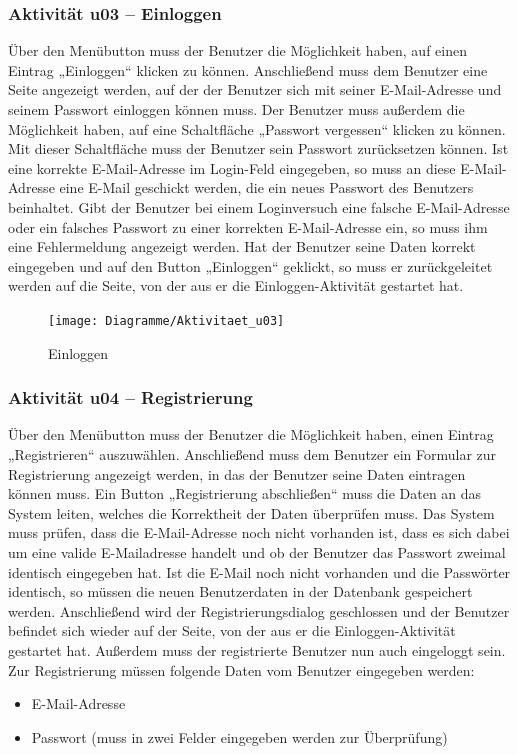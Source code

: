 \documentclass[a4paper,12pt,oneside]{scrartcl}
\begin{document}
\subsubsection{Aktivität u03 – Einloggen}
Über den Menübutton muss der Benutzer die Möglichkeit haben, auf einen Eintrag „Einloggen“ klicken zu können.
Anschließend muss dem Benutzer eine Seite angezeigt werden, auf der der Benutzer sich mit seiner E-Mail-Adresse und seinem Passwort einloggen können muss.
Der Benutzer muss außerdem die Möglichkeit haben, auf eine Schaltfläche „Passwort vergessen“ klicken zu können. Mit dieser Schaltfläche muss der Benutzer sein Passwort zurücksetzen können.
Ist eine korrekte E-Mail-Adresse im Login-Feld eingegeben, so muss an diese E-Mail-Adresse eine E-Mail geschickt werden, die ein neues Passwort des Benutzers beinhaltet.
Gibt der Benutzer bei einem Loginversuch eine falsche E-Mail-Adresse oder ein falsches Passwort zu einer korrekten E-Mail-Adresse ein, so muss ihm eine Fehlermeldung angezeigt werden.
Hat der Benutzer seine Daten korrekt eingegeben und auf den Button „Einloggen“ geklickt, so muss er zurückgeleitet werden auf die Seite, von der aus er die Einloggen-Aktivität gestartet hat.

\begin{figure}[!htbp]
\centering
\noindent\texttt{[image: Diagramme/Aktivitaet\_u03]}
\caption{Einloggen}
\end{figure}
\FloatBarrier


\subsubsection{Aktivität u04 – Registrierung}
Über den Menübutton muss der Benutzer die Möglichkeit haben, einen Eintrag „Registrieren“ auszuwählen.
Anschließend muss dem Benutzer ein Formular zur Registrierung angezeigt werden, in das der Benutzer seine Daten eintragen können muss.
Ein Button „Registrierung abschließen“ muss die Daten an das System leiten, welches die Korrektheit der Daten überprüfen muss.
Das System muss prüfen, dass die E-Mail-Adresse noch nicht vorhanden ist, dass es sich dabei um eine valide E-Mailadresse handelt und ob der Benutzer das Passwort zweimal identisch eingegeben hat.
Ist die E-Mail noch nicht vorhanden und die Passwörter identisch, so müssen die neuen Benutzerdaten in der Datenbank gespeichert werden. Anschließend wird der Registrierungsdialog geschlossen und der Benutzer befindet sich wieder auf der Seite, von der aus er die Einloggen-Aktivität gestartet hat.
Außerdem muss der registrierte Benutzer nun auch eingeloggt sein.
Zur Registrierung müssen folgende Daten vom Benutzer eingegeben werden:
\begin{itemize}
	\item E-Mail-Adresse
	\item Passwort (muss in zwei Felder eingegeben werden zur Überprüfung)
\end{itemize}
\end{document}
